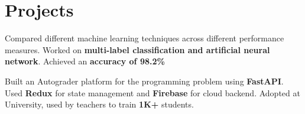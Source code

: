 \documentclass[]{deedy-resume-openfont}
\begin{document}
\begin{minipage}[t]{0.61\textwidth}

\sectionsep


\section{Projects}
Compared different machine learning techniques across different performance measures. Worked on \textbf{multi-label classification and artificial neural network}. Achieved an \textbf{accuracy of 98.2\%}
\sectionsep

Built an Autograder platform for the programming problem using \textbf{FastAPI}. Used \textbf{Redux} for state management and \textbf{Firebase} for cloud backend. Adopted at University, used by teachers to train \textbf{1K+} students.
\sectionsep



\end{minipage}
\end{document}
